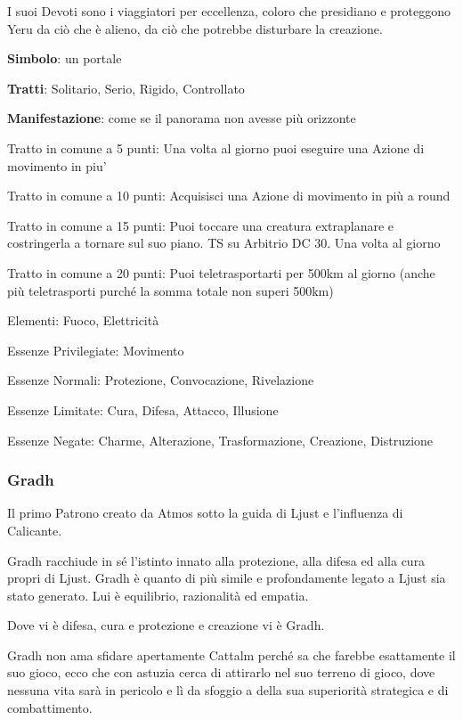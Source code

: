 \documentclass[a4paper,11pt,twoside,openany]{book}
\begin{document}
{I suoi Devoti sono i viaggiatori per eccellenza, coloro che presidiano e proteggono Yeru da ciò che è alieno, da ciò che potrebbe disturbare la creazione.

\textbf{Simbolo}: un portale

\textbf{Tratti}: Solitario, Serio, Rigido, Controllato

\textbf{Manifestazione}: come se il panorama non avesse più orizzonte

\bigskip

Tratto in comune a 5 punti: Una volta al giorno puoi eseguire una Azione di movimento in piu'

Tratto in comune a 10 punti: Acquisisci una Azione di movimento in più a round

Tratto in comune a 15 punti: Puoi toccare una creatura extraplanare e costringerla a tornare sul suo piano. TS su Arbitrio DC 30. Una volta al giorno
 
Tratto in comune a 20 punti: Puoi teletrasportarti per 500km al giorno (anche più teletrasporti purché la somma totale non superi 500km)

\bigskip

Elementi: Fuoco, Elettricità

\bigskip

Essenze Privilegiate: Movimento

Essenze Normali: Protezione, Convocazione, Rivelazione

Essenze Limitate: Cura, Difesa, Attacco, Illusione

Essenze Negate: Charme, Alterazione, Trasformazione, Creazione, Distruzione

\subsubsection{Gradh}

\label{gradh}

Il primo Patrono creato da Atmos sotto la guida di Ljust e l'influenza di Calicante.

Gradh racchiude in sé l'istinto innato alla protezione, alla difesa ed alla cura propri di Ljust. Gradh è quanto di più simile e profondamente legato a Ljust sia stato generato. Lui è equilibrio, razionalità ed empatia.

Dove vi è difesa, cura e protezione e creazione vi è Gradh.

Gradh non ama sfidare apertamente Cattalm perché sa che farebbe esattamente il suo gioco, ecco che con astuzia cerca di attirarlo nel suo terreno di gioco, dove nessuna vita sarà in pericolo e lì da sfoggio a della sua superiorità strategica e di combattimento.

}
\end{document}

